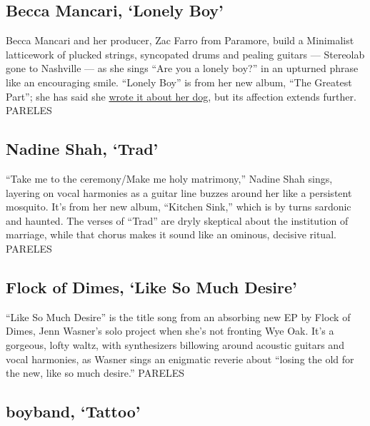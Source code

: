 \hypertarget{becca-mancari-lonely-boy}{%
\subsection{Becca Mancari, `Lonely
Boy'}\label{becca-mancari-lonely-boy}}

Becca Mancari and her producer, Zac Farro from Paramore, build a
Minimalist latticework of plucked strings, syncopated drums and pealing
guitars --- Stereolab gone to Nashville --- as she sings ``Are you a
lonely boy?'' in an upturned phrase like an encouraging smile. ``Lonely
Boy'' is from her new album, ``The Greatest Part''; she has said she
\href{https://consequenceofsound.net/2020/06/becca-mancari-origins-lonely-boy-stream/}{wrote
it about her dog}, but its affection extends further. PARELES

\hypertarget{nadine-shah-trad}{%
\subsection{Nadine Shah, `Trad'}\label{nadine-shah-trad}}

``Take me to the ceremony/Make me holy matrimony,'' Nadine Shah sings,
layering on vocal harmonies as a guitar line buzzes around her like a
persistent mosquito. It's from her new album, ``Kitchen Sink,'' which is
by turns sardonic and haunted. The verses of ``Trad'' are dryly
skeptical about the institution of marriage, while that chorus makes it
sound like an ominous, decisive ritual. PARELES

\hypertarget{flock-of-dimes-like-so-much-desire}{%
\subsection{Flock of Dimes, `Like So Much
Desire'}\label{flock-of-dimes-like-so-much-desire}}

``Like So Much Desire'' is the title song from an absorbing new EP by
Flock of Dimes, Jenn Wasner's solo project when she's not fronting Wye
Oak. It's a gorgeous, lofty waltz, with synthesizers billowing around
acoustic guitars and vocal harmonies, as Wasner sings an enigmatic
reverie about ``losing the old for the new, like so much desire.''
PARELES

\hypertarget{boyband-tattoo}{%
\subsection{boyband, `Tattoo'}\label{boyband-tattoo}}

